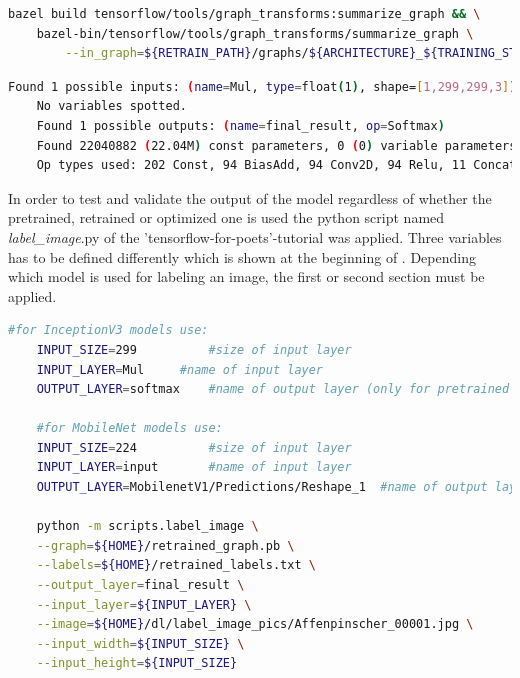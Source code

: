 \begin{minipage}{\linewidth}
\begin{lstlisting}[caption=Build and call of \textit{summarize_graph}, label=list:summarize_graph, language=bash]
	bazel build tensorflow/tools/graph_transforms:summarize_graph && \
	bazel-bin/tensorflow/tools/graph_transforms/summarize_graph \
		--in_graph=${RETRAIN_PATH}/graphs/${ARCHITECTURE}_${TRAINING_STEPS}/retrained_dog_graph_${ARCHITECTURE}_${TRAINING_STEPS}_${LEARNING_RATE}.pb
\end{lstlisting}
\end{minipage}

\begin{minipage}{\linewidth}
\begin{lstlisting}[caption=Output of \textit{summarize_graph} on a retrained and optimized InceptionV3 model, label=list:summarize_graph_out, language=bash]
	Found 1 possible inputs: (name=Mul, type=float(1), shape=[1,299,299,3]) 
	No variables spotted.
	Found 1 possible outputs: (name=final_result, op=Softmax) 
	Found 22040882 (22.04M) const parameters, 0 (0) variable parameters, and 0 control_edges
	Op types used: 202 Const, 94 BiasAdd, 94 Conv2D, 94 Relu, 11 Concat, 9 AvgPool, 5 MaxPool, 1 Add, 1 MatMul, 1 	Placeholder, 1 PlaceholderWithDefault, 1 Reshape, 1 Softmax
\end{lstlisting}
\end{minipage}



In order to test and validate the output of the model regardless of whether the pretrained, retrained or optimized one is used the python script named \textit{label\_image}.py of the 'tensorflow-for-poets'-tutorial was applied. Three variables has to be defined differently which is shown at the beginning of . Depending which model is used for labeling an image, the first or second section must be applied.

\begin{minipage}{\linewidth}
\begin{lstlisting}[caption=Call of \textit{label\_image.py}, label=list:label_image, language=bash]
	#for InceptionV3 models	use:
	INPUT_SIZE=299			#size of input layer
	INPUT_LAYER=Mul		#name of input layer
	OUTPUT_LAYER=softmax	#name of output layer (only for pretrained model otherwise 'final_result' or as defined in retrain-script)
	
	#for MobileNet models use:
	INPUT_SIZE=224			#size of input layer
	INPUT_LAYER=input	 	#name of input layer
	OUTPUT_LAYER=MobilenetV1/Predictions/Reshape_1	#name of output layer (only for pretrained model otherwise 'final_result' or as defined in retrain-script)

	python -m scripts.label_image \
	--graph=${HOME}/retrained_graph.pb \
	--labels=${HOME}/retrained_labels.txt \
	--output_layer=final_result \
	--input_layer=${INPUT_LAYER} \
	--image=${HOME}/dl/label_image_pics/Affenpinscher_00001.jpg \
	--input_width=${INPUT_SIZE} \
	--input_height=${INPUT_SIZE}
\end{lstlisting}
\end{minipage}

